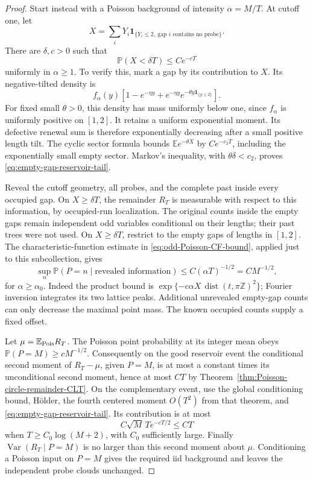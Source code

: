 \documentclass[11pt,letterpaper]{article}
\newcommand{\PP}{\mathbb P}\newcommand{\EE}{\mathbb E}
\newcommand{\ind}{\mathbf 1}\newcommand{\Exp}{\operatorname{Exp}}
\begin{document}
\begin{proof}
Start instead with a Poisson background of intensity
$\alpha=M/T$. At cutoff one, let
\[
 X=\sum_iY_i\ind_{\{Y_i\le2,\ \text{gap }i\text{ contains no probe}\}}.
\]
There are $\delta,c>0$ such that
\begin{equation}\label{eq:empty-gap-reservoir-tail}
 \PP(X<\delta T)\le Ce^{-cT}
\end{equation}
uniformly in $\alpha\ge1$. To verify this, mark a gap by its
contribution to $X$. Its negative-tilted density is
\[
 f_\alpha(y)\left[1-e^{-\eta y}
        +e^{-\eta y}e^{-\theta y\ind_{\{y\le2\}}}\right].
\]
For fixed small $\theta>0$, this density has mass uniformly
below one, since $f_\alpha$ is uniformly positive on $[1,2]$.
It retains a uniform exponential moment. Its defective renewal
sum is therefore exponentially decreasing after a small positive
length tilt. The cyclic sector formula bounds $\EE e^{-\theta X}$
by $Ce^{-c_2T}$, including the exponentially small empty sector.
Markov's inequality, with $\theta\delta<c_2$, proves
\eqref{eq:empty-gap-reservoir-tail}.

Reveal the cutoff geometry, all probes, and the complete past
inside every occupied gap. On $X\ge\delta T$, the remainder $R_T$ is measurable
with respect to this information, by occupied-run localization.
The original counts inside the empty gaps remain independent
odd variables conditional on their lengths; their past trees
were not used. On $X\ge\delta T$, restrict to the empty gaps
of lengths in $[1,2]$. The characteristic-function estimate
in \eqref{eq:odd-Poisson-CF-bound}, applied just to
this subcollection, gives
\[
 \sup_n\PP(P=n\mid\text{revealed information})
                   \le C(\alpha T)^{-1/2}=C M^{-1/2},
\]
for $\alpha\ge\alpha_0$. Indeed the product bound is
$\exp\{-c\alpha X\,\operatorname{dist}(t,\pi\mathbb Z)^2\}$;
Fourier inversion integrates its two lattice peaks. Additional
unrevealed empty-gap counts can only decrease the maximal
point mass. The known occupied counts supply a fixed offset.

Let $\mu=\EE_{\rm Pois}R_T$. The Poisson point probability
at its integer mean obeys $\PP(P=M)\ge cM^{-1/2}$.
Consequently on the good reservoir event the conditional
second moment of $R_T-\mu$, given $P=M$, is at most a constant
times its unconditional second moment, hence at most $CT$
by Theorem~\ref{thm:Poisson-circle-remainder-CLT}.
On the complementary event, use the global conditioning bound,
H\"older, the fourth centered moment $O(T^2)$ from that theorem,
and \eqref{eq:empty-gap-reservoir-tail}. Its contribution is
at most
\[
 C\sqrt M\,T e^{-cT/2}\le CT
\]
when $T\ge C_0\log(M+2)$, with $C_0$ sufficiently large.
Finally $\operatorname{Var}(R_T\mid P=M)$ is no larger than
this second moment about $\mu$. Conditioning a Poisson input
on $P=M$ gives the required iid background and leaves the
independent probe clouds unchanged.
\end{proof}
\end{document}

